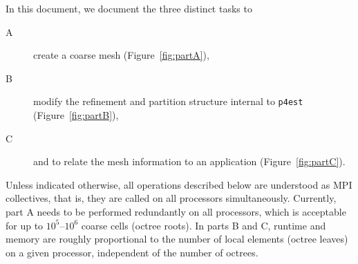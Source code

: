 \documentclass[letterpaper,11pt]{article}
\newcommand{\pforest}{\texttt{p4est}\xspace}
\newcommand{\figref}[1]{Figure~\ref{fig:#1}}
\begin{document}
In this document, we document the three distinct tasks to
\begin{description}
\item[A] create a coarse mesh (\figref{partA}),
\item[B] modify the refinement and partition structure internal to \pforest
  (\figref{partB}),
\item[C] and to relate the mesh information to an application (\figref{partC}).
\end{description}
Unless indicated otherwise, all operations described below are understood as
MPI collectives, that is, they are called on all processors simultaneously.
Currently, part A needs to be performed redundantly on all processors, which is
acceptable for up to $10^5$--$10^6$ coarse cells (octree roots).  In parts B
and C, runtime and memory are roughly proportional to the number of local
elements (octree leaves) on a given processor, independent of the number of
octrees.
\end{document}
